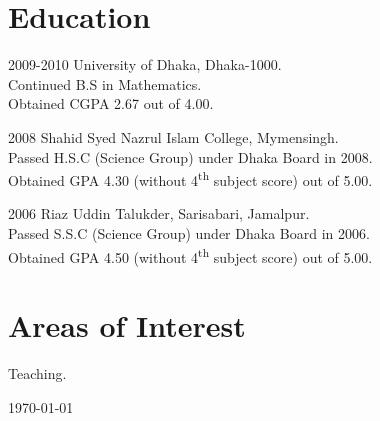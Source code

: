 \documentclass[a4paper]{article}
\begin{document}
\section{Education}

\begin{CV}
\item[2009-2010] University of Dhaka, Dhaka-1000.\\Continued  B.S in Mathematics.\\Obtained CGPA 2.67 out of 4.00.
\item[2008] Shahid Syed Nazrul Islam College, Mymensingh.\\Passed H.S.C (Science Group) under Dhaka Board in 2008.\\Obtained GPA 4.30 (without 4\textsuperscript{th} subject score) out of 5.00.
\item[2006] Riaz Uddin Talukder, Sarisabari, Jamalpur.\\Passed S.S.C (Science Group) under Dhaka Board in 2006.\\Obtained GPA 4.50 (without 4\textsuperscript{th} subject score) out of 5.00.
\end{CV}




\section{Areas of Interest}
\begin{CV}
\item Teaching.
\end{CV}




\noindent \today
\end{document}
